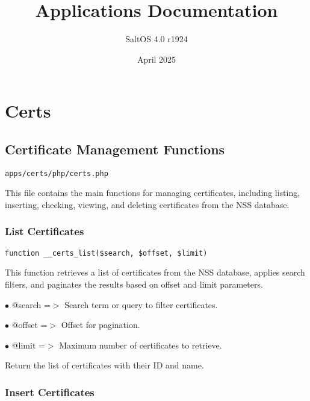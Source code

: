 \documentclass[a4paper]{article}
\title{Applications Documentation}
\author{SaltOS 4.0 r1924}
\begin{document}
\date{April 2025}
\maketitle
\clearpage

\tableofcontents
\clearpage


\hypertarget{toc1}{}
\section{Certs}

\hypertarget{toc2}{}
\subsection{Certificate Management Functions}

\begin{lstlisting}
apps/certs/php/certs.php
\end{lstlisting}

This file contains the main functions for managing certificates, including listing,
inserting, checking, viewing, and deleting certificates from the NSS database.

\hypertarget{toc3}{}
\subsubsection{List Certificates}

\begin{lstlisting}
function __certs_list($search, $offset, $limit)
\end{lstlisting}

This function retrieves a list of certificates from the NSS database, applies search filters,
and paginates the results based on offset and limit parameters.

\begin{compactitem}
\item[\color{myblue}$\bullet$] @search =$>$ Search term or query to filter certificates.
\item[\color{myblue}$\bullet$] @offset =$>$ Offset for pagination.
\item[\color{myblue}$\bullet$] @limit  =$>$ Maximum number of certificates to retrieve.
\end{compactitem}

Return the list of certificates with their ID and name.

\hypertarget{toc4}{}
\subsubsection{Insert Certificates}
\end{document}
